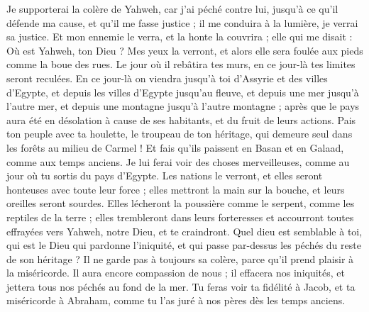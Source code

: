 \begin{multicols}{2}
Je supporterai la colère de Yahweh, car j'ai péché contre lui, jusqu'à ce qu'il défende ma cause, et qu'il me fasse justice ; il me conduira à la lumière, je verrai sa justice.
Et mon ennemie le verra, et la honte la couvrira ; elle qui me disait : Où est Yahweh, ton Dieu ? Mes yeux la verront, et alors elle sera foulée aux pieds comme la boue des rues.
Le jour où il rebâtira tes murs, en ce jour-là tes limites seront reculées.
En ce jour-là on viendra jusqu'à toi d'Assyrie et des villes d'Egypte, et depuis les villes d'Egypte jusqu'au fleuve, et depuis une mer jusqu'à l'autre mer, et depuis une montagne jusqu'à l'autre montagne ;
après que le pays aura été en désolation à cause de ses habitants, et du fruit de leurs actions.
Pais ton peuple avec ta houlette, le troupeau de ton héritage, qui demeure seul dans les forêts au milieu de Carmel ! Et fais qu'ils paissent en Basan et en Galaad, comme aux temps anciens.
Je lui ferai voir des choses merveilleuses, comme au jour où tu sortis du pays d'Egypte.
Les nations le verront, et elles seront honteuses avec toute leur force ; elles mettront la main sur la bouche, et leurs oreilles seront sourdes.
Elles lécheront la poussière comme le serpent, comme les reptiles de la terre ; elles trembleront dans leurs forteresses et accourront toutes effrayées vers Yahweh, notre Dieu, et te craindront.
Quel dieu est semblable à toi, qui est le Dieu qui pardonne l'iniquité, et qui passe par-dessus les péchés du reste de son héritage ? Il ne garde pas à toujours sa colère, parce qu'il prend plaisir à la miséricorde.
Il aura encore compassion de nous ; il effacera nos iniquités, et jettera tous nos péchés au fond de la mer.
Tu feras voir ta fidélité à Jacob, et ta miséricorde à Abraham, comme tu l'as juré à nos pères dès les temps anciens.
\PPE{}
\end{multicols}
